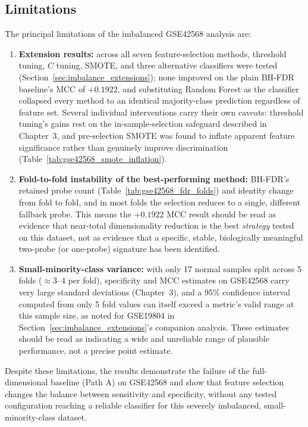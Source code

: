 \subsection{Limitations}
\label{sec:limitations}

The principal limitations of the imbalanced GSE42568 analysis are:

\begin{enumerate}
    \item \textbf{Extension results:} across all seven feature-selection methods, threshold tuning, $C$ tuning, SMOTE, and three alternative classifiers were tested (Section~\ref{sec:imbalance_extensions}); none improved on the plain BH-FDR baseline's MCC of $+0.1922$, and substituting Random Forest as the classifier collapsed every method to an identical majority-class prediction regardless of feature set. Several individual interventions carry their own caveats: threshold tuning's gains rest on the in-sample-selection safeguard described in Chapter~3, and pre-selection SMOTE was found to inflate apparent feature significance rather than genuinely improve discrimination (Table~\ref{tab:gse42568_smote_inflation}).

    \item \textbf{Fold-to-fold instability of the best-performing method:} BH-FDR's retained probe count (Table~\ref{tab:gse42568_fdr_folds}) and identity change from fold to fold, and in most folds the selection reduces to a single, different fallback probe. This means the $+0.1922$ MCC result should be read as evidence that near-total dimensionality reduction is the best \emph{strategy} tested on this dataset, not as evidence that a specific, stable, biologically meaningful two-probe (or one-probe) signature has been identified.

    \item \textbf{Small-minority-class variance:} with only 17 normal samples split across 5 folds ($\approx$3--4 per fold), specificity and MCC estimates on GSE42568 carry very large standard deviations (Chapter~3), and a 95\% confidence interval computed from only 5 fold values can itself exceed a metric's valid range at this sample size, as noted for GSE19804 in Section~\ref{sec:imbalance_extensions}'s companion analysis. These estimates should be read as indicating a wide and unreliable range of plausible performance, not a precise point estimate.
\end{enumerate}

Despite these limitations, the results demonstrate the failure of the full-dimensional baseline (Path A) on GSE42568 and show that feature selection changes the balance between sensitivity and specificity, without any tested configuration reaching a reliable classifier for this severely imbalanced, small-minority-class dataset.